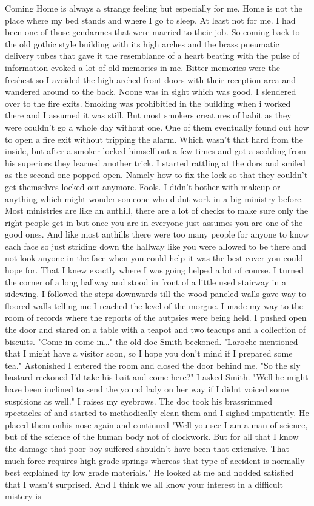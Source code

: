 \newscene

Coming Home is always a strange feeling but especially for me. Home is not the place where my bed stands and where I go to sleep. At least not for me. I had been one of those gendarmes that were married to their job. So coming back to the old gothic style building with its high arches and the brass pneumatic delivery tubes that gave it the resemblance of a heart beating with the pulse of information evoked a lot of old memories in me. Bitter memories were the freshest so I avoided the high arched front doors with their reception area and wandered around to the back. Noone was in sight which was good. I slendered over to the fire exits. Smoking was prohibitied in the building when i worked there and I assumed it was still. But most smokers creatures of habit as they were couldn't go a whole day without one. One of them eventually found out how to open a fire exit without tripping the alarm. Which wasn't that hard from the inside, but after a smoker locked himself out a few times and got a scolding from his superiors they learned another trick. I started rattling at the dors and smiled as the second one popped open. Namely how to fix the lock so that they couldn't get themselves locked out anymore. Fools. I didn't bother with makeup or anything which might wonder someone who didnt work in a big ministry before. Most ministries are like an anthill, there are a lot of checks to make sure only the right people get in but once you are in everyone just assumes you are one of the good ones. And like most anthills there were too many people for anyone to know each face so just striding down the hallway like you were allowed to be there and not look anyone in the face when you could help it was the best cover you could hope for. That I knew exactly where I was going helped a lot of course. I turned the corner of a long hallway and stood in front of a little used stairway in a sidewing. I followed the steps downwards till the wood paneled walls gave way to floored walls telling me I reached the level of the morgue. I made my way to the room of records where the reports of the autpsies were being held. I pushed open the door and stared on a table with a teapot and two teacups and a collection of biscuits. "Come in come in\dots" the old doc Smith beckoned. "Laroche mentioned that I might have a visitor soon, so I hope you don't mind if I prepared some tea." Astonished I entered the room and closed the door behind me. "So the sly bastard reckoned I'd take his bait and come here?" I asked Smith. "Well he might have been inclined to send the yound lady on her way if I didnt voiced some suspisions as well." I raises my eyebrows. The doc took his brassrimmed spectacles of and started to methodically clean them and I sighed impatiently. He placed them onhis nose again and continued "Well you see I am a man of science, but of the science of the human body not of clockwork. But for all that I know the damage that poor boy suffered shouldn't have been that extensive. That much force requires high grade springs whereas that type of accident is normally best explained by low grade materials." He looked at me and nodded satisfied that I wasn't surprised. And I think we all know your interest in a difficult mistery is 